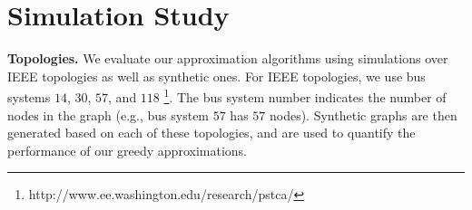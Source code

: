 \section{Simulation Study}
\label{sec:simulations}

\textbf{Topologies.} We evaluate our approximation algorithms using simulations over IEEE topologies as well as synthetic ones. For IEEE topologies, we use bus systems $14$, $30$, $57$, and $118$
{\footnote {\small http://www.ee.washington.edu/research/pstca/}}.  The bus system number indicates the number of nodes in the graph (e.g., bus system $57$ has $57$ nodes).
Synthetic graphs are then generated based on each of these topologies, and are used to quantify the performance of our greedy approximations.

